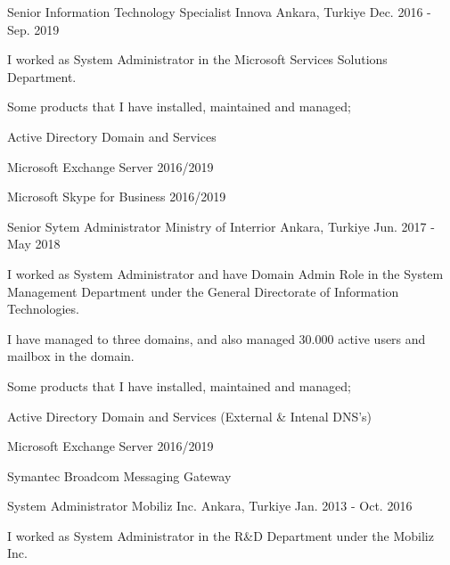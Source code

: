 \begin{cventries}
{\begin{cvitems}
      \end{cvitems}
    }
  \cventry
    {Senior Information Technology Specialist} %
    {Innova} %
    {Ankara, Turkiye} %
    {Dec. 2016 - Sep. 2019} %
    {
      \begin{cvitems} %
        \item {I worked as System Administrator in the Microsoft Services Solutions Department.}
        \item {Some products that I have installed, maintained and managed;}
        \item {Active Directory Domain and Services}
        \item {Microsoft Exchange Server 2016/2019}
        \item {Microsoft Skype for Business 2016/2019}
      \end{cvitems}
    }
  \cventry
    {Senior Sytem Administrator} %
    {Ministry of Interrior} %
    {Ankara, Turkiye} %
    {Jun. 2017 - May 2018} %
    {
      \begin{cvitems} %
        \item {I worked as System Administrator and have Domain Admin Role in the System Management Department under the General Directorate of Information Technologies.}
        \item {I have managed to three domains, and also managed 30.000 active users and mailbox in the domain.}
        \item {Some products that I have installed, maintained and managed;}
        \item {Active Directory Domain and Services (External \& Intenal DNS's)}
        \item {Microsoft Exchange Server 2016/2019}
        \item {Symantec Broadcom Messaging Gateway}
      \end{cvitems}
    }
  \cventry
    {System Administrator} %
    {Mobiliz Inc.} %
    {Ankara, Turkiye} %
    {Jan. 2013 - Oct. 2016} %
    {
      \begin{cvitems} %
        \item {I worked as System Administrator in the R\&D Department under the Mobiliz Inc.}

\end{cvitems}}
\end{cventries}
